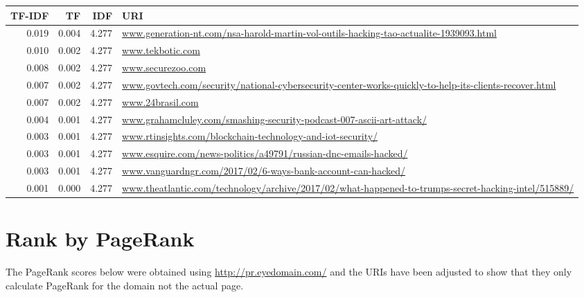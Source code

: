 \documentclass[12pt, a4paper]{article}
\begin{document}
\begin{table}[H]
\centering
\begin{tabularx}{\textwidth}{rrrX }
  \hline
  TF-IDF & TF & IDF & URI \\ 
  \hline
  0.019 & 0.004 & 4.277 & \url{www.generation-nt.com/nsa-harold-martin-vol-outils-hacking-tao-actualite-1939093.html} \\ 
  0.010 & 0.002 & 4.277 & \url{www.tekbotic.com} \\ 
  0.008 & 0.002 & 4.277 & \url{www.securezoo.com} \\ 
  0.007 & 0.002 & 4.277 & \url{www.govtech.com/security/national-cybersecurity-center-works-quickly-to-help-its-clients-recover.html} \\ 
  0.007 & 0.002 & 4.277 & \url{www.24brasil.com} \\ 
  0.004 & 0.001 & 4.277 & \url{www.grahamcluley.com/smashing-security-podcast-007-ascii-art-attack/} \\ 
  0.003 & 0.001 & 4.277 & \url{www.rtinsights.com/blockchain-technology-and-iot-security/} \\ 
  0.003 & 0.001 & 4.277 & \url{www.esquire.com/news-politics/a49791/russian-dnc-emails-hacked/} \\ 
  0.003 & 0.001 & 4.277 & \url{www.vanguardngr.com/2017/02/6-ways-bank-account-can-hacked/} \\ 
  0.001 & 0.000 & 4.277 & \url{www.theatlantic.com/technology/archive/2017/02/what-happened-to-trumps-secret-hacking-intel/515889/} \\ 
  \hline
\end{tabularx}
\end{table}

\newpage
\section{Rank by PageRank}

The PageRank scores below were obtained using
\url{http://pr.eyedomain.com/} and the URIs have
been adjusted to show that they only calculate
PageRank for the domain not the actual page.
\end{document}
